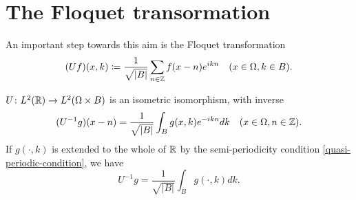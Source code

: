 \section{The Floquet transormation}
An important step towards this aim is the Floquet transformation
	\begin{equation}
		(Uf)(x, k) \coloneqq \frac{1}{\sqrt{|B|}} \sum_{n \in \mathbb{Z}} f(x - n) e^{ikn} \quad (x \in \Omega, k \in B). \label{floquet-transformation}
	\end{equation}
		
\begin{theorem} \label{3.2:thm-UIsometricIsomorphism}
	$ U \colon L^{2}(\mathbb{R}) \rightarrow L^{2}(\Omega \times B)$ is an isometric isomorphism, with inverse
		\begin{equation}
			(U^{-1}g)(x - n) = \frac{1}{\sqrt{|B|}} \int_{B} g(x, k) e^{-ikn} dk \quad (x \in \Omega, n \in \mathbb{Z}). \label{3.8}
		\end{equation} 
	If $g(\cdot, k)$ is extended to the whole of $\mathbb{R}$ by the semi-periodicity condition \eqref{quasi-periodic-condition}, we have
		\begin{equation}
			U^{-1} g = \frac{1}{\sqrt{|B|}} \int_{B} g(\cdot, k) dk. \label{3.9}
		\end{equation}
		

\end{theorem}
